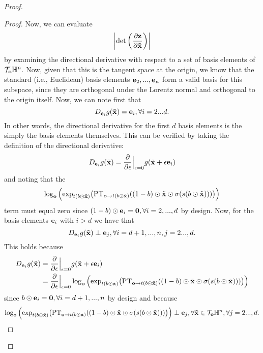 \begin{proof}
\begin{proof}
Now, we can evaluate 
$$
\left|\textrm{det}\left(\frac{\partial \mathbf{z}}{\partial \tilde{\mathbf{x}}}\right)\right|
$$
by examining the directional derivative with respect to a set of basis elements of $\mathcal{T}_{\mathbf{o}}\mathbb{H}^{n}$.
Now, given that this is the tangent space at the origin, we know that the standard (i.e., Euclidean) basis elements $\mathbf{e}_2, ..., \mathbf{e}_n$ form a valid basis for this subspace, since they are orthogonal under the Lorentz normal and orthogonal to the origin itself. 
Now, we can note first that
\begin{equation}
    D_{\mathbf{e}_i}g(\tilde{\mathbf{x}}) = \mathbf{e}_i, \forall i=2...d.
\end{equation}
In other words, the directional derivative for the first $d$ basis elements is the simply the basis elements themselves. This can be verified by taking the definition of the directional derivative:
\begin{equation}
     D_{\mathbf{e}_i}g(\tilde{\mathbf{x}})  = \frac{\partial}{\partial \epsilon}\Big|_{\epsilon = 0}g(\tilde{\mathbf{x}} + \epsilon\mathbf{e}_i)
\end{equation}
and noting that the 
$$
\log_{\textbf{o}}\Big( \textnormal{exp}_{t(b \odot \tilde{\mathbf{x}})}\big(\textnormal{PT}_{\textbf{o}\to t(b \odot \tilde{\mathbf{x}}) }((1-b) \odot \tilde{\mathbf{x}} \odot \sigma(s(b \odot \tilde{\mathbf{x}})))\big)\Big)
$$
term must equal zero since $(1-b)\odot \mathbf{e}_i = \mathbf{0}, \forall i = 2, ..., d$ by design. 
Now, for the basis elements $\mathbf{e}_i$ with $i>d$ we have that
\begin{equation}
     D_{\mathbf{e}_i}g(\tilde{\mathbf{x}}) \perp \mathbf{e}_j, \forall i=d+1, ..., n, j=2...,d.
\end{equation}
This holds because 
\begin{align}
D_{\mathbf{e}_i}g(\tilde{\mathbf{x}})  &= \frac{\partial}{\partial \epsilon}\Big|_{\epsilon = 0}g(\tilde{\mathbf{x}} + \epsilon\mathbf{e}_i) \\
 &= \frac{\partial}{\partial \epsilon}\Big|_{\epsilon = 0}    \log_{\textbf{o}}\Big( \textnormal{exp}_{t(b \odot \tilde{\mathbf{x}})}\big(\textnormal{PT}_{\textbf{o}\to t(b \odot \tilde{\mathbf{x}}) }((1-b) \odot \tilde{\mathbf{x}} \odot \sigma(s(b \odot \tilde{\mathbf{x}})))\big)\Big) 
\end{align}
since $b \odot \mathbf{e}_i = \mathbf{0}, \forall i = d+1, ..., n$ by design and because
\begin{equation}
   \log_{\textbf{o}}\Big( \textnormal{exp}_{t(b \odot \tilde{\mb{x}})}\big(\textnormal{PT}_{\textbf{o}\to t(b \odot \tilde{\mb{x}}) }((1-b) \odot \tilde{\mb{x}} \odot \sigma(s(b \odot \tildex)))\big)\Big) \perp \mb{e}_j, \forall \tildex \in \mc{T}_\mb{o}\mbb{H}^n, \forall  j=2...,d.

\end{equation}
\end{proof}
\end{proof}
